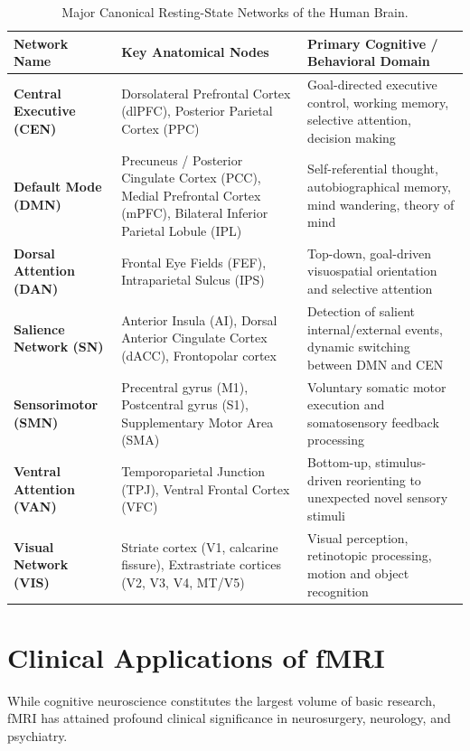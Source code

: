 \documentclass[11pt,a4paper]{article}
\begin{document}
\begin{table}[htbp]
\centering
\small
\caption{Major Canonical Resting-State Networks of the Human Brain.}
\label{tab:rsn_networks}
\begin{tabular}{p{3.8cm} p{5.5cm} p{5.2cm}}
\toprule
\textbf{Network Name} & \textbf{Key Anatomical Nodes} & \textbf{Primary Cognitive / Behavioral Domain} \\
\midrule
\textbf{Central Executive (CEN)} & Dorsolateral Prefrontal Cortex (dlPFC), Posterior Parietal Cortex (PPC) & Goal-directed executive control, working memory, selective attention, decision making \\
\addlinespace
\textbf{Default Mode (DMN)} & Precuneus / Posterior Cingulate Cortex (PCC), Medial Prefrontal Cortex (mPFC), Bilateral Inferior Parietal Lobule (IPL) & Self-referential thought, autobiographical memory, mind wandering, theory of mind \\
\addlinespace
\textbf{Dorsal Attention (DAN)} & Frontal Eye Fields (FEF), Intraparietal Sulcus (IPS) & Top-down, goal-driven visuospatial orientation and selective attention \\
\addlinespace
\textbf{Salience Network (SN)} & Anterior Insula (AI), Dorsal Anterior Cingulate Cortex (dACC), Frontopolar cortex & Detection of salient internal/external events, dynamic switching between DMN and CEN \\
\addlinespace
\textbf{Sensorimotor (SMN)} & Precentral gyrus (M1), Postcentral gyrus (S1), Supplementary Motor Area (SMA) & Voluntary somatic motor execution and somatosensory feedback processing \\
\addlinespace
\textbf{Ventral Attention (VAN)} & Temporoparietal Junction (TPJ), Ventral Frontal Cortex (VFC) & Bottom-up, stimulus-driven reorienting to unexpected novel sensory stimuli \\
\addlinespace
\textbf{Visual Network (VIS)} & Striate cortex (V1, calcarine fissure), Extrastriate cortices (V2, V3, V4, MT/V5) & Visual perception, retinotopic processing, motion and object recognition \\
\bottomrule
\end{tabular}
\end{table}

\section{Clinical Applications of fMRI}
While cognitive neuroscience constitutes the largest volume of basic research, fMRI has attained profound clinical significance in neurosurgery, neurology, and psychiatry.
\end{document}
